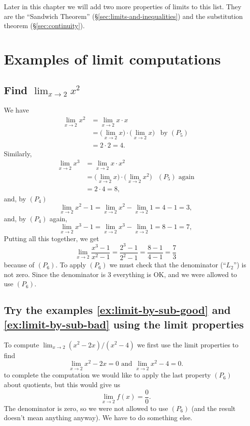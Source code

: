Later in this chapter we will add two more properties of limits to
this list.  They are the ``Sandwich Theorem''
(\S\ref{sec:limits-and-inequalities}) and the substitution theorem
(\S\ref{sec:continuity}).

\section{Examples of limit computations} 

\subsection{Find $\lim_{x\to2}x^2$} 
We have
\begin{align*}
  \lim_{x\to2} x^2 &= \lim_{x\to2} x\cdot x \\
  &= \bigl( \lim_{x\to2} x\bigr)\cdot \bigl( \lim_{x\to2} x\bigr)
  &\text{by $(P_5)$}\\
  &= 2\cdot 2 = 4.
\end{align*}
Similarly,
\begin{align*}
  \lim_{x\to2} x^3 &= \lim_{x\to2} x\cdot x^2 \\
  &= \bigl( \lim_{x\to2} x\bigr)\cdot \bigl( \lim_{x\to2} x^2\bigr)
  &\text{$(P_5)$ again}\\
  &= 2\cdot 4 = 8,
\end{align*}
and, by $(P_4)$
\[
\lim_{x\to2} x^2-1 = \lim_{x\to2} x^2 - \lim_{x\to2} 1 = 4-1 = 3,
\]
and, by $(P_4)$ again,
\[
\lim_{x\to2} x^3-1 = \lim_{x\to2} x^3 - \lim_{x\to2} 1 = 8-1 = 7,
\]
Putting all this together, we get
\[
\lim_{x\to 2}\frac{x^3-1}{x^2-1} = \frac{2^3-1}{2^2-1} = \frac{8-1}{4-1}=
\frac{7}{3}
\]
because of $(P_6)$.  To apply $(P_6)$ we must check that the denominator
(``$L_2$'') is not zero.  Since the denominator is 3 everything is OK, and
we were allowed to use $(P_6)$.


\subsection{Try the examples \ref{ex:limit-by-sub-good} and \ref{ex:limit-by-sub-bad} using the limit properties} 
To compute $\lim_{x\to 2}(x^2-2x)/(x^2-4)$ we first use the limit
properties to find
\[
\lim_{x\to2} x^2-2x = 0 \text{ and }\lim_{x\to 2}x^2 - 4 = 0.
\]
to complete the computation we would like to apply the last property
$(P_6)$ about quotients, but this would give us
\[
\lim_{x\to2} f(x) = \frac 00.
\]
The denominator is zero, so we were not allowed to use $(P_6)$ (and the
result doesn't mean anything anyway).  We have to do something else.


